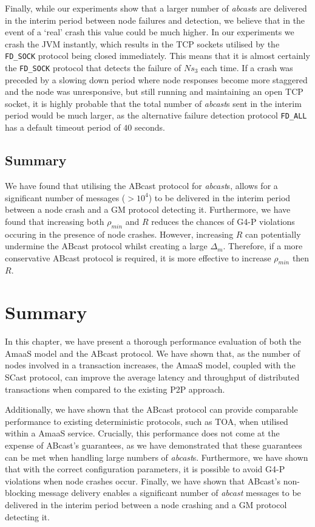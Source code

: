     Finally, while our experiments show that a larger number of \emph{abcast}s are delivered in the interim period between node failures and detection, we believe that in the event of a \textquoteleft{}real' crash this value could be much higher.  In our experiments we crash the JVM instantly, which results in the TCP sockets utilised by the \texttt{FD\_SOCK} protocol being closed immediately.  This means that it is almost certainly the \texttt{FD\_SOCK} protocol that detects the failure of $Ns_3$ each time.  If a crash was preceded by a slowing down period where node responses become more staggered and the node was unresponsive, but still running and maintaining an open TCP socket, it is highly probable that the total number of \emph{abcast}s sent in the interim period would be much larger, as the alternative failure detection protocol \texttt{FD\_ALL} has a default timeout period of $40$ seconds.  
        
    \subsection{Summary}
        We have found that utilising the \textsf{ABcast} protocol for \emph{abcast}s, allows for a significant number of messages ($> 10^4$) to be delivered in the interim period between a node crash and a GM protocol detecting it.  Furthermore, we have found that increasing both $\rho_{min}$ and $R$ reduces the chances of G4-P violations occuring in the presence of node crashes.  However, increasing $R$ can potentially undermine the \textsf{ABcast} protocol whilst creating a large $\Delta_m$.  Therefore, if a more conservative \textsf{ABcast} protocol is required, it is more effective to increase $\rho_{min}$ then $R$.  
        
\section{Summary}
In this chapter, we have present a thorough performance evaluation of both the \textsf{AmaaS} model and the \textsf{ABcast} protocol.  We have shown that, as the number of nodes involved in a transaction increases, the \textsf{AmaaS} model, coupled with the \textsf{SCast} protocol, can improve the average latency and throughput of distributed transactions when compared to the existing P2P approach.  

Additionally, we have shown that the \textsf{ABcast} protocol can provide comparable performance to existing deterministic protocols, such as TOA, when utilised within a \textsf{AmaaS} service.  Crucially, this performance does not come at the expense of \textsf{ABcast}'s guarantees, as we have demonstrated that these guarantees can be met when handling large numbers of \emph{abcast}s.  Furthermore, we have shown that with the correct configuration parameters, it is possible to avoid G4-P violations when node crashes occur.  Finally, we have shown that \textsf{ABcast}'s non-blocking message delivery enables a significant number of \emph{abcast} messages to be delivered in the interim period between a node crashing and a GM protocol detecting it.  